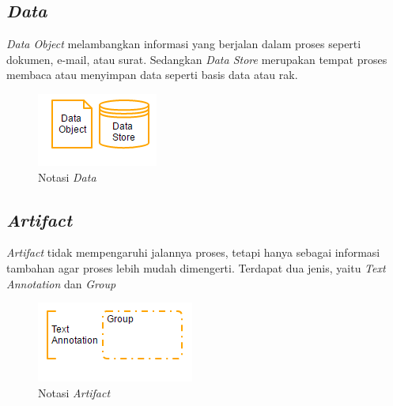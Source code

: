 \subsection{\textit{Data}}
\label{sec:data}
\textit{Data Object} melambangkan informasi yang berjalan dalam proses seperti dokumen, e-mail, atau surat. Sedangkan \textit{Data Store} merupakan tempat proses membaca atau menyimpan data seperti basis data atau rak. 
\begin{figure}[H]
	\centering
	\includegraphics[scale=1]{Gambar/Bab-2/bpmn/data}
	\caption{Notasi \textit{Data}} 
	\label{data}
\end{figure}


\subsection{\textit{Artifact}}
\label{sec:artifacts}
\textit{Artifact} tidak mempengaruhi jalannya proses, tetapi hanya sebagai informasi tambahan agar proses lebih mudah dimengerti. Terdapat dua jenis, yaitu \textit{Text Annotation} dan \textit{Group}
\begin{figure}[H]
	\centering
	\includegraphics[scale=1]{Gambar/Bab-2/bpmn/artifact}
	\caption{Notasi \textit{Artifact} }
	\label{artifact}
\end{figure}


